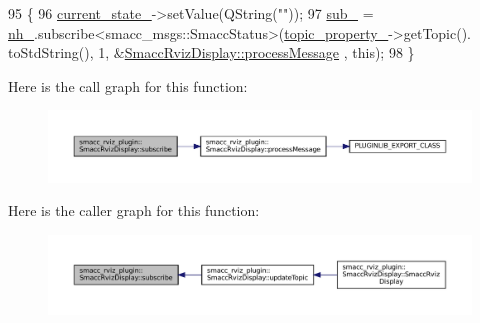 \begin{DoxyCode}
95   \{
96       \hyperlink{classsmacc__rviz__plugin_1_1SmaccRvizDisplay_a342ff238c1dfaa427f09ee205a9e92d5}{current\_state\_}->setValue(QString(\textcolor{stringliteral}{""}));
97       \hyperlink{classsmacc__rviz__plugin_1_1SmaccRvizDisplay_abae6e8df8428a072d1de2c59dd4f9cd4}{sub\_} = \hyperlink{classsmacc__rviz__plugin_1_1SmaccRvizDisplay_a077ef80f5698d21376b2d211f95ab73d}{nh\_}.subscribe<smacc\_msgs::SmaccStatus>(\hyperlink{classsmacc__rviz__plugin_1_1SmaccRvizDisplay_ad81e5239e1343b2ba01ee16d1f010932}{topic\_property\_}->getTopic().
      toStdString(), 1, &\hyperlink{classsmacc__rviz__plugin_1_1SmaccRvizDisplay_acc7281b99c92fa89f7494f6ca53e4905}{SmaccRvizDisplay::processMessage} , \textcolor{keyword}{this});
98   \}
\end{DoxyCode}
Here is the call graph for this function\+:
\nopagebreak
\begin{figure}[H]
\begin{center}
\leavevmode
\includegraphics[width=350pt]{classsmacc__rviz__plugin_1_1SmaccRvizDisplay_ad774027ba3eda277c991619332495cbb_cgraph}
\end{center}
\end{figure}
Here is the caller graph for this function\+:
\nopagebreak
\begin{figure}[H]
\begin{center}
\leavevmode
\includegraphics[width=350pt]{classsmacc__rviz__plugin_1_1SmaccRvizDisplay_ad774027ba3eda277c991619332495cbb_icgraph}
\end{center}
\end{figure}
\mbox{\label{classsmacc__rviz__plugin_1_1SmaccRvizDisplay_a49a35acd10a664a8335ef5852f8c115c}} 
